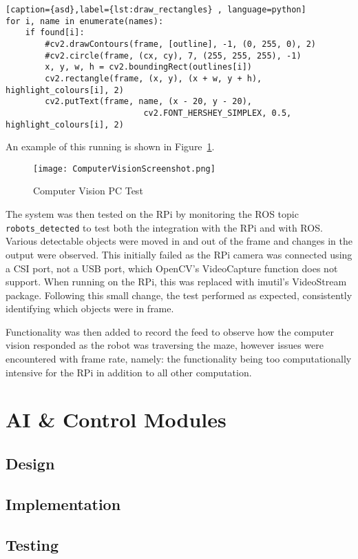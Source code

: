 \begin{lstlisting}[caption={asd},label={lst:draw_rectangles} , language=python]
for i, name in enumerate(names):
    if found[i]:
        #cv2.drawContours(frame, [outline], -1, (0, 255, 0), 2)
        #cv2.circle(frame, (cx, cy), 7, (255, 255, 255), -1)
        x, y, w, h = cv2.boundingRect(outlines[i])
        cv2.rectangle(frame, (x, y), (x + w, y + h), highlight_colours[i], 2)
        cv2.putText(frame, name, (x - 20, y - 20),
                            cv2.FONT_HERSHEY_SIMPLEX, 0.5, highlight_colours[i], 2)
\end{lstlisting}

An example of this running is shown in Figure~\ref{fig:cv_screenshot}.

\begin{figure}[!ht]
	\centering
	\texttt{[image: ComputerVisionScreenshot.png]}
	\caption{Computer Vision PC Test}\label{fig:cv_screenshot}

\end{figure}

The system was then tested on the RPi by monitoring the ROS topic \verb|robots_detected| to
test both the integration with the RPi and with ROS. Various detectable objects were moved in
and out of the frame and changes in the output were observed. This initially failed as the RPi
camera was connected using a CSI port, not a USB port, which OpenCV's VideoCapture function
does not support. When running on the RPi, this was replaced with imutil's VideoStream package.
Following this small change, the test performed as expected, consistently identifying which objects were in
frame.

Functionality was then added to record the feed to observe how the computer vision responded as
the robot was traversing the maze, however issues were encountered with frame rate, namely: the functionality being too
computationally intensive for the RPi in addition to all other computation.


\section{AI \& Control Modules}\label{soft/ai}

\subsection{Design}\label{soft/ai/design}

\subsection{Implementation}\label{soft/ai/impl}

\subsection{Testing}\label{soft/ai/test}

